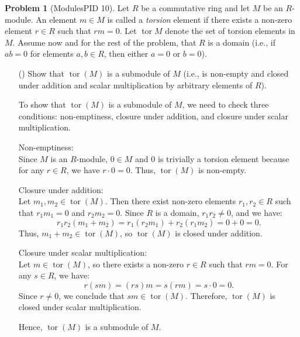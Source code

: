 \documentclass[12pt]{article}
\theoremstyle{definition}
\newtheorem{problem}{Problem}
\newcounter{subq}[problem]
\newenvironment{subproblem}
{\refstepcounter{subq} \begin{itemize} \item[(\alph{subq})]}
{\end{itemize} \medskip}
\DeclareMathOperator{\tor}{tor}
\begin{document}
\begin{problem} [ModulesPID 10]
    Let $R$ be a commutative ring and let $M$ be an $R$-module. An element $m \in M$ is called a \textit{torsion} element if there exists
    a non-zero element $r \in R$ such that $rm = 0$. Let $\tor{M}$ denote the set of torsion elements in $M$. Assume now and for the rest
    of the problem, that $R$ is a domain (i.e., if $ab = 0$ for elements $a, b \in R$, then either $a = 0$ or $b = 0$).

    \begin{subproblem}
        Show that $\tor(M)$ is a submodule of $M$ (i.e., is non-empty and closed under addition and scalar multiplication by
        arbitrary elements of $R$).

        \begin{solution}
            To show that \( \tor(M) \) is a submodule of \( M \), we need to check three conditions: non-emptiness, closure under addition, and closure under scalar multiplication.

            Non-emptiness:  \\
            Since \( M \) is an \( R \)-module, \( 0 \in M \) and \( 0 \) is trivially a torsion element because for any \( r \in R \), we have \( r \cdot 0 = 0 \). Thus, \( \tor(M) \) is non-empty.

            Closure under addition:  \\
            Let \( m_1, m_2 \in \tor(M) \). Then there exist non-zero elements \( r_1, r_2 \in R \) such that \( r_1 m_1 = 0 \) and \( r_2 m_2 = 0 \). Since \( R \) is a domain, \( r_1 r_2 \neq 0 \), and we have:
            \[
            r_1 r_2 (m_1 + m_2) = r_1 (r_2 m_1) + r_2 (r_1 m_2) = 0 + 0 = 0.
            \]
            Thus, \( m_1 + m_2 \in \tor(M) \), so \( \tor(M) \) is closed under addition.

            Closure under scalar multiplication:  \\
            Let \( m \in \tor(M) \), so there exists a non-zero \( r \in R \) such that \( r m = 0 \). For any \( s \in R \), we have:
            \[
            r (s m) = (r s) m = s (r m) = s \cdot 0 = 0.
            \]
            Since \( r \neq 0 \), we conclude that \( s m \in \tor(M) \). Therefore, \( \tor(M) \) is closed under scalar multiplication.

            Hence, \( \tor(M) \) is a submodule of \( M \).


        \end{solution}
    \end{subproblem}


\end{problem}
\end{document}
